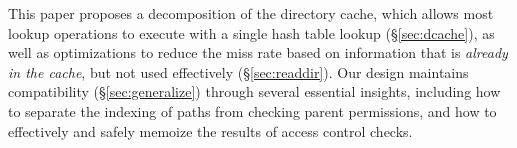 This paper proposes a decomposition of the directory cache, which allows
most lookup operations to execute with a single hash table lookup (\S\ref{sec:dcache}),
as well as optimizations to reduce the miss rate based on information that is {\em already in the cache}, but not used effectively (\S\ref{sec:readdir}).
Our design maintains compatibility (\S\ref{sec:generalize}) through 
several essential insights, including 
how to separate the indexing of paths from checking parent permissions,
and how to effectively and safely memoize the results of access control checks.




